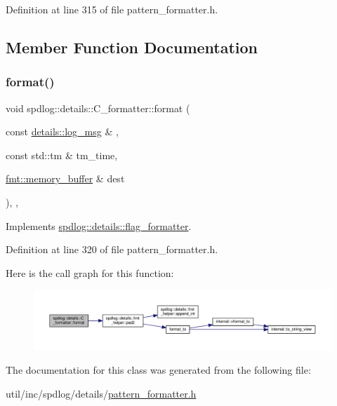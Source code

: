 Definition at line 315 of file pattern\+\_\+formatter.\+h.



\subsection{Member Function Documentation}
\mbox{\label{classspdlog_1_1details_1_1_c__formatter_a241d6298edc054937cf40c0d7ed90ae2}} 
\subsubsection{\texorpdfstring{format()}{format()}}
{\footnotesize\ttfamily void spdlog\+::details\+::\+C\+\_\+formatter\+::format (\begin{DoxyParamCaption}\item[{const \hyperlink{structspdlog_1_1details_1_1log__msg}{details\+::log\+\_\+msg} \&}]{,  }\item[{const std\+::tm \&}]{tm\+\_\+time,  }\item[{\hyperlink{format_8h_a21cbf729f69302f578e6db21c5e9e0d2}{fmt\+::memory\+\_\+buffer} \&}]{dest }\end{DoxyParamCaption})\hspace{0.3cm}{\ttfamily [inline]}, {\ttfamily [override]}, {\ttfamily [virtual]}}



Implements \hyperlink{classspdlog_1_1details_1_1flag__formatter_a33fb3e42a4c8200cceb833d92b53fb67}{spdlog\+::details\+::flag\+\_\+formatter}.



Definition at line 320 of file pattern\+\_\+formatter.\+h.

Here is the call graph for this function\+:
\nopagebreak
\begin{figure}[H]
\begin{center}
\leavevmode
\includegraphics[width=350pt]{classspdlog_1_1details_1_1_c__formatter_a241d6298edc054937cf40c0d7ed90ae2_cgraph}
\end{center}
\end{figure}


The documentation for this class was generated from the following file\+:\begin{DoxyCompactItemize}
\item 
util/inc/spdlog/details/\hyperlink{pattern__formatter_8h}{pattern\+\_\+formatter.\+h}\end{DoxyCompactItemize}
